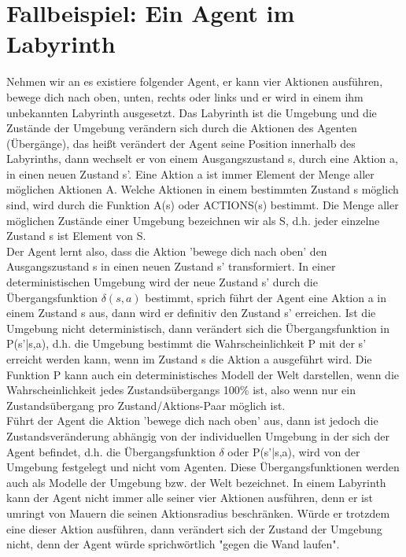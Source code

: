 \section{Fallbeispiel: Ein Agent im Labyrinth}
Nehmen wir an es existiere folgender Agent, er kann vier Aktionen ausführen, bewege dich nach oben, unten, rechts oder links und er wird in einem ihm unbekannten Labyrinth ausgesetzt. Das Labyrinth ist die Umgebung und die Zustände der Umgebung verändern sich durch die Aktionen des Agenten (Übergänge), das heißt verändert der Agent seine Position innerhalb des Labyrinths, dann wechselt er von einem Ausgangszustand s, durch eine Aktion a, in einen neuen Zustand s'. Eine Aktion a ist immer Element der Menge aller möglichen Aktionen A. Welche Aktionen in einem bestimmten Zustand s möglich sind, wird durch die Funktion A(s) oder ACTIONS(s) bestimmt. Die Menge aller möglichen Zustände einer Umgebung bezeichnen wir als S, d.h. jeder einzelne Zustand s ist Element von S.\\

Der Agent lernt also, dass die Aktion 'bewege dich nach oben' den Ausgangszustand s in einen neuen Zustand s' transformiert. In einer deterministischen Umgebung wird der neue Zustand s' durch die Übergangsfunktion $\delta(s, a)$ bestimmt, sprich führt der Agent eine Aktion a in einem Zustand s aus, dann wird er definitiv den Zustand s' erreichen. Ist die Umgebung nicht deterministisch, dann verändert sich die Übergangsfunktion in P(s'|s,a), d.h. die Umgebung bestimmt die Wahrscheinlichkeit P mit der s' erreicht werden kann, wenn im Zustand s die Aktion a ausgeführt wird. Die Funktion P kann auch ein deterministisches Modell der Welt darstellen, wenn die Wahrscheinlichkeit jedes Zustandsübergangs 100\% ist, also wenn nur ein Zustandsübergang pro Zustand/Aktions-Paar möglich ist. \\

Führt der Agent die Aktion 'bewege dich nach oben' aus, dann ist jedoch die Zustandsveränderung abhängig von der individuellen Umgebung in der sich der Agent befindet, d.h. die Übergangsfunktion $\delta$ oder P(s'|s,a), wird von der Umgebung festgelegt und nicht vom Agenten. Diese Übergangsfunktionen werden auch als Modelle der Umgebung bzw. der Welt bezeichnet. In einem Labyrinth kann der Agent nicht immer alle seiner vier Aktionen ausführen, denn er ist umringt von Mauern die seinen Aktionsradius beschränken. Würde er trotzdem eine dieser Aktion ausführen, dann verändert sich der Zustand der Umgebung nicht, denn der Agent würde sprichwörtlich "gegen die Wand laufen". \\

